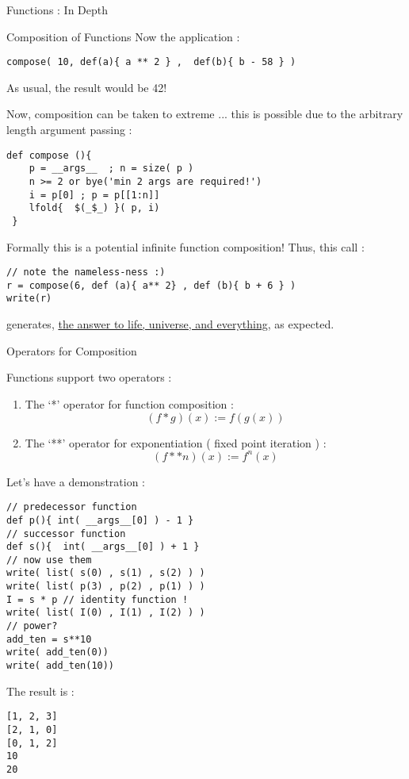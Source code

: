 \begin{section}{Functions : In Depth}
\begin{subsection}{Composition of Functions}
Now the application :

\begin{lstlisting}[style=JexlStyle]
 compose( 10, def(a){ a ** 2 } ,  def(b){ b - 58 } )
\end{lstlisting}
 
As usual, the result would be 42!

Now, composition can be taken to extreme ... this is possible due to the arbitrary length argument passing :

\begin{lstlisting}[style=JexlStyle]
def compose (){
    p = __args__  ; n = size( p ) 
    n >= 2 or bye('min 2 args are required!') 
    i = p[0] ; p = p[[1:n]]
    lfold{  $(_$_) }( p, i) 
 }
\end{lstlisting}
 
Formally this is a potential infinite function composition! Thus, this call :

\begin{lstlisting}[style=JexlStyle]
// note the nameless-ness :)
r = compose(6, def (a){ a** 2} , def (b){ b + 6 } )
write(r)
\end{lstlisting}

generates, \href{https://www.google.co.in/search?client=safari&rls=en&q=the+answer+to+life,+universe,+and+everything&ie=UTF-8&oe=UTF-8&gfe\_rd=cr&ei=hHDIVsv-BsGL8QedmLnwDg}{the answer to life, universe, and everything}, as expected.

\end{subsection}

\begin{subsection}{Operators for Composition}

Functions support two operators :
\begin{enumerate}
\item{ The `*' operator for function composition :
   $$
   ( f * g) ( x ) := f ( g ( x ) )  
   $$
}
\item { The `**' operator for exponentiation ( fixed point iteration ) : 
  $$
   ( f ** n ) (x) := f^n(x)     
  $$
}
\end{enumerate}
Let's have a demonstration :

\begin{lstlisting}[style=JexlStyle]
// predecessor function 
def p(){ int( __args__[0] ) - 1 }
// successor function 
def s(){  int( __args__[0] ) + 1 }
// now use them 
write( list( s(0) , s(1) , s(2) ) )
write( list( p(3) , p(2) , p(1) ) )
I = s * p // identity function !
write( list( I(0) , I(1) , I(2) ) )
// power?
add_ten = s**10 
write( add_ten(0))
write( add_ten(10))
\end{lstlisting}
The result is :
\begin{lstlisting}[style=all]
[1, 2, 3]
[2, 1, 0]
[0, 1, 2]
10
20
\end{lstlisting}


\end{subsection}
\end{section}
